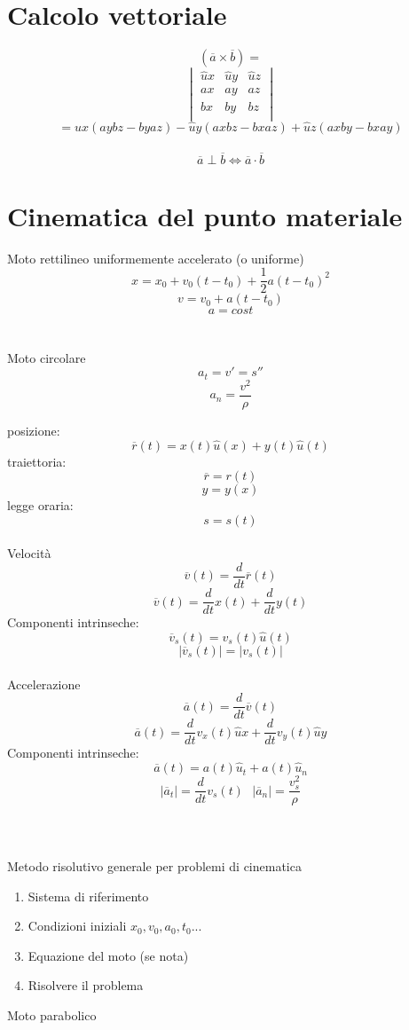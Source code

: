 \documentclass{article}
\begin{document}
\section{Calcolo vettoriale}

\[(\overline{a} \times \overline{b}) = \] 
\[
\begin{vmatrix}
	\hat{u}x & \hat{u}y & \hat{u}z \\
	ax       & ay       & az       \\
	bx       & by       & bz       \\ 
\end{vmatrix}
\]
\[
= \hat{u}x(aybz-byaz) -\hat{u}y(axbz-bxaz) +\hat{u}z(axby-bxay) 
\]\\
\[
\overline{a} \perp \overline{b} \iff \overline{a} \cdot \overline{b}
\]

\section{Cinematica del punto materiale}
\large{Moto rettilineo uniformemente accelerato (o uniforme)}
\[x=x_0+v_0(t-t_0)+\frac{1}{2}a(t-t_0)^2\]
\[v=v_0+a(t-t_0)\]
\[a=cost\]\\\\
\large{Moto circolare}
\[a_t=v'=s''\]
\[a_n=\frac{v^2}{\rho}\]

posizione: \[\overline{r}(t) = x(t)\hat{u}(x) + y(t)\hat{u}(t)\]
traiettoria: \[\overline{r} = r(t)\]   \[y = y(x)\]
legge oraria: \[s = s(t)\]
\\
\large{Velocità}
\[\overline{v}(t) = \frac{d}{dt}\overline{r}(t)\]
\[\overline{v}(t) = \frac{d}{dt}x(t) + \frac{d}{dt}y(t)\]
Componenti intrinseche: \[\overline{v}_s(t) = v_s(t)\hat{u}(t)\]
\[|\overline{v}_s(t)| = |v_s(t)|\]\\
\large{Accelerazione}
\[\overline{a}(t) = \frac{d}{dt}\overline{v}(t)\]
\[\overline{a}(t) = \frac{d}{dt}v_x(t)\hat{u}x + \frac{d}{dt}v_y(t)\hat{u}y\]
Componenti intrinseche: \[\overline{a}(t) = a(t)\hat{u}_t + a(t)\hat{u}_n\]
\[|\overline{a}_t| = \frac{d}{dt}v_s(t) \text{     } |\overline{a}_n| = \frac{v_s^2}{\rho}\]\\\\\\
\large{Metodo risolutivo generale per problemi di cinematica}
\begin{enumerate}
	\item Sistema di riferimento 
	\item Condizioni iniziali \(x_0, v_0, a_0, t_0 ...\)
	\item Equazione del moto (se nota)
	\item Risolvere il problema
\end{enumerate}
\large{Moto parabolico}
\end{document}
